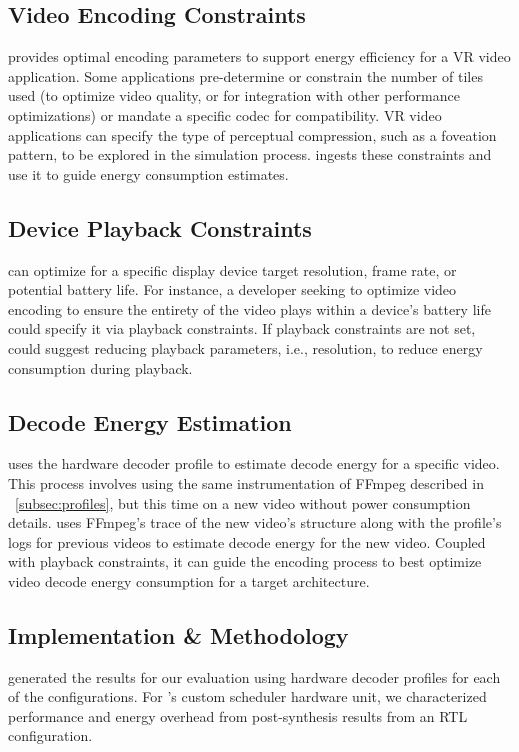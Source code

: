 \subsection{Video Encoding Constraints}
\nameArchprof provides optimal encoding parameters to support energy efficiency for a VR video application.
Some applications pre-determine or constrain the number of tiles used (to optimize video quality, or for integration with other performance optimizations) or mandate a specific codec for compatibility.
VR video applications can specify the type of perceptual compression, such as a foveation pattern, to be explored in the simulation process.
\nameArchprof ingests these constraints and use it to guide energy consumption estimates.

\subsection{Device Playback Constraints}
\nameArchprof can optimize for a specific display device target resolution, frame rate, or potential battery life.
For instance, a developer seeking to optimize video encoding to ensure the entirety of the video plays within a device's battery life could specify it via playback constraints.
If playback constraints are not set, \nameArchprof could suggest reducing playback parameters, i.e., resolution, to reduce energy consumption during playback.

\subsection{Decode Energy Estimation}
\nameArchprof uses the hardware decoder profile to estimate decode energy for a specific video.
This process involves using the same instrumentation of {FFmpeg} described in ~\ref{subsec:profiles}, but this time on a new video without power consumption details.
\nameArchprof uses {FFmpeg}'s trace of the new video's structure along with the profile's logs for previous videos to estimate decode energy for the new video.
Coupled with playback constraints, it can guide the encoding process to best optimize video decode energy consumption for a target architecture.


\subsection{Implementation \& Methodology}
\nameArchprof generated the results for our evaluation using hardware decoder profiles for each of the \nameArch configurations.
For \nameArch's custom scheduler hardware unit, we characterized performance and energy overhead from post-synthesis results from an RTL configuration.

